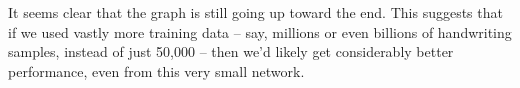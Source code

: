 \documentclass[a4paper,twoside,10pt]{book}
\begin{document}
It seems clear that the graph is still going up toward the end. This suggests that if we used vastly more training data -- say, millions or even billions of handwriting samples, instead of just 50,000 -- then we'd likely get considerably better performance, even from this very small network.

%
%
%
%
%
%
\end{document}
